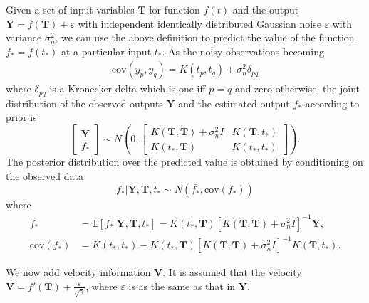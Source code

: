 Given a set of input variables $\mathbf{T}$ for function $f(t)$ and the output $\mathbf{Y}=f(\mathbf{T})+\varepsilon$ with independent identically distributed Gaussian noise $\varepsilon$ with variance $\sigma_n^2$,  we can use the above definition to predict the value of the function $f_*=f(t_*)$ at a particular input $t_*$. As the noisy observations becoming
\begin{align*}
\text{cov}(y_p,y_q) = K(t_p,t_q)+\sigma_n^2 \delta_{pq}
\end{align*}
where $\delta_{pq}$ is a Kronecker delta which is one iff $p=q$ and zero otherwise, the joint distribution of the observed outputs $\mathbf{Y}$ and the estimated output $f_*$ according to prior is
\begin{equation}
\left[ \begin{matrix}
\mathbf{Y}\\
f_*
\end{matrix} \right] \sim N \left(  
0,\left[   \begin{matrix}
K(\mathbf{T},\mathbf{T}) +\sigma_n^2I& K(\mathbf{T},t_*) \\
K(t_*,\mathbf{T}) & K(t_*,t_*)
\end{matrix}  \right] 
\right).
\end{equation}
The posterior distribution over the predicted value is obtained by conditioning on the observed data 
\begin{equation}
f_* | \mathbf{Y},\mathbf{T},t_* \sim N(\bar{f_*},\text{cov}(f_*))
\end{equation}
where 
\begin{align*}
\bar{f_*}&=\mathbb{E}[f_* | \mathbf{Y},\mathbf{T},t_* ]=K(t_*,\mathbf{T})[K(\mathbf{T},\mathbf{T})+\sigma_n^2I]^{-1}\mathbf{Y},\\
\text{cov}(f_*)&=K(t_*,t_*)-K(t_*,\mathbf{T})[K(\mathbf{T},\mathbf{T})+\sigma_n^2I]^{-1}K(\mathbf{T},t_*).
\end{align*}

We now add velocity information $\mathbf{V}$. It is assumed that the velocity $\mathbf{V}=f'(\mathbf{T})+\frac{\varepsilon}{\sqrt{\gamma}}$, where $\varepsilon$ is as the same  as that in $\mathbf{Y}$. 

